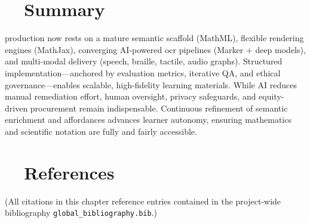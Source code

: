 \section{~~Summary}\label{ch11:sec:summary}
 production now rests on a mature semantic scaffold (MathML), flexible rendering engines (MathJax), converging AI-powered \gls{ocr} pipelines (Marker + deep models), and multi-modal delivery (speech, braille, tactile, audio graphs).\supercite{W3CMathML4, Marker, MathJaxDocs, ViewPlusAGC} Structured implementation—anchored by evaluation metrics, iterative QA, and ethical governance—enables scalable, high-fidelity learning materials. While AI reduces manual remediation effort, human oversight, privacy safeguards, and equity-driven procurement remain indispensable. Continuous refinement of semantic enrichment and  affordances advances learner autonomy, ensuring mathematics and scientific notation are fully and fairly accessible.

\section{~~References}\label{ch11:sec:references}
\noindent (All citations in this chapter reference entries contained in the project-wide bibliography \texttt{global\_bibliography.bib}.)

